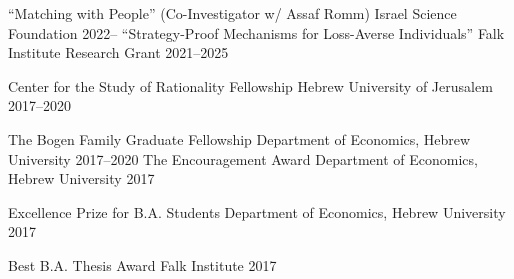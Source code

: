  
 \begin{cvhonors}

 \cvhonor
    {``Matching with People'' (Co-Investigator w/ Assaf Romm)} %
    {Israel Science Foundation} %
    {} %
    {2022--} %
  \cvhonor
    {``Strategy-Proof Mechanisms for Loss-Averse Individuals''} %
    {Falk Institute Research Grant} %
    {} %
    {2021--2025} %

\end{cvhonors}
\begin{cvhonors}

  \cvhonor
    {Center for the Study of Rationality Fellowship} %
    {Hebrew University of Jerusalem} %
    {} %
    {2017--2020} %

  \cvhonor
    {The Bogen Family Graduate Fellowship} %
    {Department of Economics, Hebrew University} %
    {} %
    {2017--2020} %
  \cvhonor
    {The Encouragement Award} %
    {Department of Economics, Hebrew University} %
    {} %
    {2017} %


  \cvhonor
    {Excellence Prize for B.A. Students} %
    {Department of Economics, Hebrew University} %
    {} %
    {2017} %

  \cvhonor
    {Best B.A. Thesis Award}	%
    {Falk Institute} %
    {} %
    {2017} %



\end{cvhonors}
